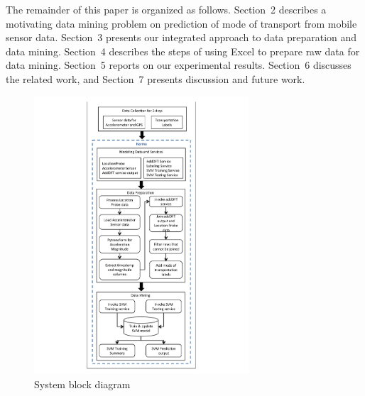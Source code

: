 The remainder of this paper is organized as follows. Section~2 describes a motivating data mining problem on prediction of mode of transport from mobile sensor data. Section~3 presents our integrated approach to data preparation and data mining. Section~4 describes the steps of using Excel to prepare raw data for data mining. Section~5 reports on our experimental results. Section~6 discusses the related work, and Section~7 presents discussion and future work.


\begin{figure}[ht!]
\centering
\includegraphics[width=80mm]{img/system_diagram.pdf}
\caption{System block diagram\label{fig:system_diagram}}
\end{figure}
